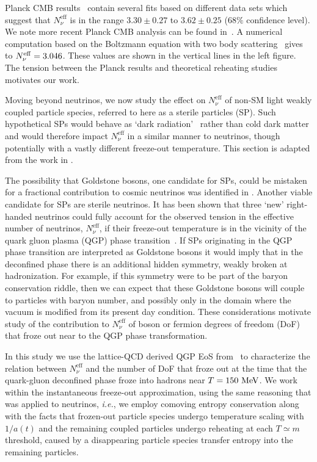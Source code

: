  
Planck CMB results~\cite{Planck:2013pxb} contain several fits based on different data sets which suggest that $N^{\mathrm{eff}}_\nu$ is in the range $3.30\pm 0.27$ to $3.62\pm0.25$ ($68\%$ confidence level). We note more recent Planck CMB analysis can be found in~\cite{Planck:2018vyg}. A numerical computation based on the Boltzmann equation with two body scattering~\cite{Mangano:2005cc} gives to $N_{\nu}^{\rm eff}=3.046$. These values are shown in the vertical lines in the left figure. The tension between the Planck results and theoretical reheating studies motivates our work.

Moving beyond neutrinos, we now study the effect on $N_\nu^{\text{eff}}$ of non-SM light weakly coupled particle species, referred to here as a sterile particles (SP). Such hypothetical SPs would behave as `dark radiation'~\cite{Steigman:2013yua} rather than cold dark matter and would therefore impact $N_\nu^{\text{eff}}$ in a similar manner to neutrinos, though potentially with a vastly different freeze-out temperature. This section is adapted from the work in \cite{Birrell:2014cja}.


The possibility that Goldstone bosons, one candidate for SPs, could be mistaken for a fractional contribution to cosmic neutrinos was identified in \cite{Weinberg:2013kea}. Another viable candidate for SPs are sterile neutrinos. It has been shown that three `new' right-handed neutrinos could fully account for the observed tension in the effective number of neutrinos, $N^{\text{eff}}_{\nu}$, if their freeze-out temperature is in the vicinity of the quark gluon plasma (QGP) phase transition~\cite{Anchordoqui:2011nh,Anchordoqui:2012qu}. If SPs originating in the QGP phase transition are interpreted as Goldstone bosons it would imply that in the deconfined phase there is an additional hidden symmetry, weakly broken at hadronization. For example, if this symmetry were to be part of the baryon conservation riddle, then we can expect that these Goldstone bosons will couple to particles with baryon number, and possibly only in the domain where the vacuum is modified from its present day condition. These considerations motivate study of the contribution to 
$N^{\text{eff}}_{\nu}$ of boson or fermion degrees of freedom (DoF) that froze out near to the QGP phase transformation. 

In this study we use the lattice-QCD derived QGP EoS from~\cite{Borsanyi:2013bia} to characterize the relation between $N^{\text{eff}}_{\nu}$ and the number of DoF that froze out at the time that the quark-gluon deconfined phase froze into hadrons near $T=150\text{ MeV}$. We work within the instantaneous freeze-out approximation, using the same reasoning that was applied to neutrinos, {\it i.e.\/}, we employ comoving entropy conservation along with the facts that frozen-out particle species undergo temperature scaling with $1/a(t)$ and the remaining coupled particles undergo reheating at each $T\simeq m$ threshold, caused by a disappearing particle species transfer entropy into the remaining particles.



